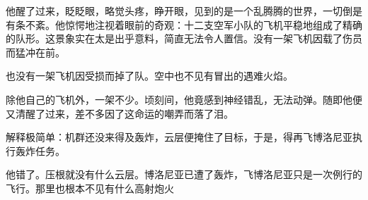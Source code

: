     他醒了过来，眨眨眼，略觉头疼，睁开眼，见到的是一个乱腾腾的世界，一切倒是有条不紊。他惊愕地注视着眼前的奇观：十二支空军小队的飞机平稳地组成了精确的队形。这景象实在太是出乎意料，简直无法令人置信。没有一架飞机因载了伤员而猛冲在前。

    也没有一架飞机因受损而掉了队。空中也不见有冒出的遇难火焰。

    除他自己的飞机外，一架不少。顷刻间，他竟感到神经错乱，无法动弹。随即他便又清醒了过来，差不多因了这命运的嘲弄而落了泪。

    解释极简单：机群还没来得及轰炸，云层便掩住了目标，于是，得再飞博洛尼亚执行轰炸任务。

    他错了。压根就没有什么云层。博洛尼亚已遭了轰炸，飞博洛尼亚只是一次例行的飞行。那里也根本不见有什么高射炮火
